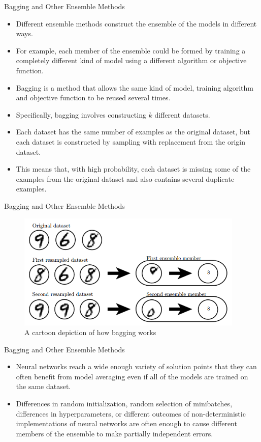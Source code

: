 \documentclass[10pt]{beamer}
\begin{document}
	\begin{frame}{Bagging and Other Ensemble Methods}
		\begin{itemize}
			\item Different ensemble methods construct the ensemble of the models in different ways.
			\pause
			\item For example, each member of the ensemble could be formed by training a completely different kind of model using a different algorithm or objective function.
			\pause
			\item Bagging is a method that allows the same kind of model, training algorithm and objective function to be reused several times.
			\pause
			\item Specifically, bagging involves constructing $k$ different datasets.
			\pause
			\item Each dataset has the same number of examples as the original dataset, but each dataset is constructed by sampling with replacement from the origin dataset.
			\pause
			\item This means that, with high probability, each dataset is missing some of the examples from the original dataset and also contains several duplicate examples.
		\end{itemize}
	\end{frame}
	
	\begin{frame}{Bagging and Other Ensemble Methods}
		\begin{figure}
			\includegraphics[height=15em]{figures/bagging.png}
			\caption{A cartoon depiction of how bagging works}
		\end{figure}
	\end{frame}
	
	\begin{frame}{Bagging and Other Ensemble Methods}
		\begin{itemize}
			\item Neural networks reach a wide enough variety of solution points that they can often benefit from model averaging even if all of the models are trained on the same dataset.
			\pause
			\item Differences in random initialization, random selection of minibatches, differences in hyperparameters, or different outcomes of non-deterministic implementations of neural networks are often enough to cause different members of the ensemble to make partially independent errors.
		\end{itemize}
	\end{frame}
	
\end{document}
